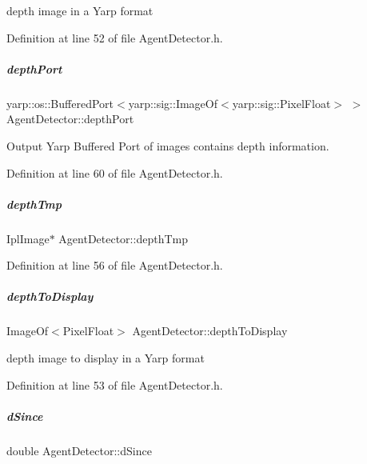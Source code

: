 depth image in a Yarp format 



Definition at line 52 of file Agent\+Detector.\+h.

\mbox{\label{group__agentDetector_af0e69945340f969d71c0e1cf3b7dbc2b}} 
\subparagraph{\texorpdfstring{depth\+Port}{depthPort}}
{\footnotesize\ttfamily yarp\+::os\+::\+Buffered\+Port$<$yarp\+::sig\+::\+Image\+Of$<$yarp\+::sig\+::\+Pixel\+Float$>$ $>$ Agent\+Detector\+::depth\+Port\hspace{0.3cm}{\ttfamily [protected]}}



Output Yarp Buffered Port of images contains depth information. 



Definition at line 60 of file Agent\+Detector.\+h.

\mbox{\label{group__agentDetector_a87d602df434b454a1e0d727c4a1cafcb}} 
\subparagraph{\texorpdfstring{depth\+Tmp}{depthTmp}}
{\footnotesize\ttfamily Ipl\+Image$\ast$ Agent\+Detector\+::depth\+Tmp\hspace{0.3cm}{\ttfamily [protected]}}



Definition at line 56 of file Agent\+Detector.\+h.

\mbox{\label{group__agentDetector_a24cfdd0522338cab6d61d8a172a9a6d2}} 
\subparagraph{\texorpdfstring{depth\+To\+Display}{depthToDisplay}}
{\footnotesize\ttfamily Image\+Of$<$Pixel\+Float$>$ Agent\+Detector\+::depth\+To\+Display\hspace{0.3cm}{\ttfamily [protected]}}



depth image to display in a Yarp format 



Definition at line 53 of file Agent\+Detector.\+h.

\mbox{\label{group__agentDetector_a1866219161a7e18eedc710a943687565}} 
\subparagraph{\texorpdfstring{d\+Since}{dSince}}
{\footnotesize\ttfamily double Agent\+Detector\+::d\+Since\hspace{0.3cm}{\ttfamily [protected]}}



